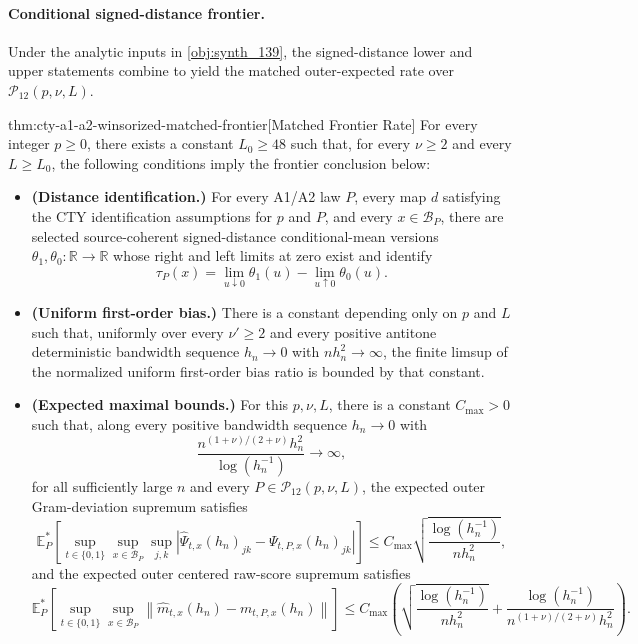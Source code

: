 \documentclass[11pt]{article}
\begin{document}
\paragraph{Conditional signed-distance frontier.}
Under the analytic inputs in \cref{obj:synth_139}, the signed-distance lower and upper statements combine to yield the matched outer-expected rate over \(\mathcal P_{12}(p,\nu,L)\).

\begin{theoremv}{thm:cty-a1-a2-winsorized-matched-frontier}[Matched Frontier Rate]
For every integer \(p\geq 0\), there exists a constant \(L_0\geq 48\) such that, for every \(\nu\geq 2\) and every \(L\geq L_0\), the following conditions imply the frontier conclusion below:
\begin{itemize}
\item \textbf{(Distance identification.)} For every A1/A2 law \(P\), every map \(d\) satisfying the CTY identification assumptions for \(p\) and \(P\), and every \(x\in\mathcal B_P\), there are selected source-coherent signed-distance conditional-mean versions \(\theta_1,\theta_0:\mathbb R\to\mathbb R\) whose right and left limits at zero exist and identify
\[
\tau_P(x)=\lim_{u\downarrow 0}\theta_1(u)-\lim_{u\uparrow 0}\theta_0(u).
\]
\item \textbf{(Uniform first-order bias.)} There is a constant depending only on \(p\) and \(L\) such that, uniformly over every \(\nu'\geq 2\) and every positive antitone deterministic bandwidth sequence \(h_n\to0\) with \(n h_n^2\to\infty\), the finite limsup of the normalized uniform first-order bias ratio is bounded by that constant.
\item \textbf{(Expected maximal bounds.)} For this \(p,\nu,L\), there is a constant \(C_{\mathrm{max}}>0\) such that, along every positive bandwidth sequence \(h_n\to0\) with
\[
\frac{n^{(1+\nu)/(2+\nu)}h_n^2}{\log(h_n^{-1})}\to\infty,
\]
for all sufficiently large \(n\) and every \(P\in\mathcal P_{12}(p,\nu,L)\), the expected outer Gram-deviation supremum satisfies
\[
\mathbb E_P^*\!\left[
\sup_{t\in\{0,1\}}\sup_{x\in\mathcal B_P}\sup_{j,k}
\left|\widehat\Psi_{t,x}(h_n)_{jk}-\Psi_{t,P,x}(h_n)_{jk}\right|
\right]
\leq
C_{\mathrm{max}}
\sqrt{\frac{\log(h_n^{-1})}{n h_n^2}},
\]
and the expected outer centered raw-score supremum satisfies
\[
\mathbb E_P^*\!\left[
\sup_{t\in\{0,1\}}\sup_{x\in\mathcal B_P}
\left\|\widehat m_{t,x}(h_n)-m_{t,P,x}(h_n)\right\|
\right]
\leq
C_{\mathrm{max}}\left(
\sqrt{\frac{\log(h_n^{-1})}{n h_n^2}}
+
\frac{\log(h_n^{-1})}{n^{(1+\nu)/(2+\nu)}h_n^2}
\right).
\]

\end{itemize}
\end{theoremv}
\end{document}

